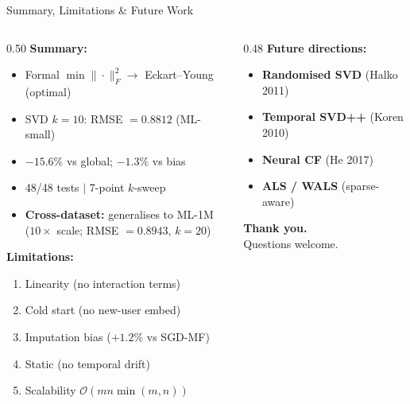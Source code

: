 \documentclass[10pt,t]{beamer}
\begin{document}
\begin{frame}{Summary, Limitations \& Future Work}
  \begin{columns}[t]
    \begin{column}{0.50\textwidth}
      \textbf{Summary:}
      \begin{itemize}
        \item Formal $\min\|\cdot\|_F^2 \to$ Eckart--Young (optimal)
        \item SVD $k=10$: RMSE $= 0.8812$ (ML-small)
        \item $-15.6\%$ vs global; $-1.3\%$ vs bias
        \item 48/48 tests $\mid$ 7-point $k$-sweep
        \item \textbf{Cross-dataset:} generalises to ML-1M\\
              ($10\times$ scale; RMSE $= 0.8943$, $k=20$)
      \end{itemize}

      \vspace{0.4em}
      \textbf{Limitations:}
      \begin{enumerate}
        \small
        \item Linearity (no interaction terms)
        \item Cold start (no new-user embed)
        \item Imputation bias ($+1.2\%$ vs SGD-MF)
        \item Static (no temporal drift)
        \item Scalability $\mathcal{O}(mn\min(m,n))$
      \end{enumerate}
    \end{column}
    \begin{column}{0.48\textwidth}
      \textbf{Future directions:}
      \begin{itemize}
        \item \textbf{Randomised SVD} (Halko 2011)
        \item \textbf{Temporal SVD++} (Koren 2010)
        \item \textbf{Neural CF} (He 2017)
        \item \textbf{ALS / WALS} (sparse-aware)
      \end{itemize}

      \vspace{0.6em}
      \begin{block}{}
        \centering
        \textbf{Thank you.}\\
        \small Questions welcome.
      \end{block}
    \end{column}
  \end{columns}
\end{frame}
\end{document}
